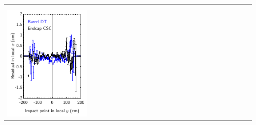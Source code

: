 \documentclass[compress]{beamer}
\begin{document}
\begin{frame}
\begin{center}
\begin{tabular}{p{0.35\linewidth} p{0.35\linewidth} p{0.35\linewidth}}
\begin{minipage}{\linewidth}
      \end{minipage} \\
      & & \\
      \begin{minipage}{\linewidth}
	\includegraphics[width=\linewidth]{init_xresid_vs_y}
      \end{minipage} &
      \begin{minipage}{\linewidth}
	\hspace{-0.7 cm}

\end{minipage}
\end{tabular}
\end{center}
\end{frame}
\end{document}
